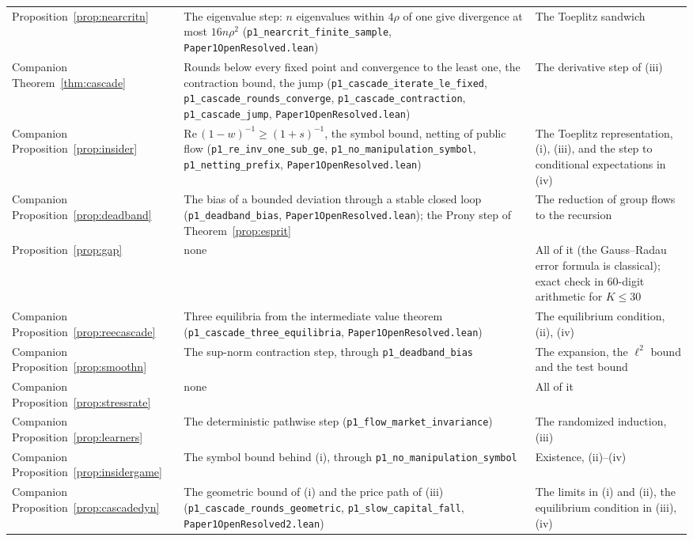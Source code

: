 \documentclass[12pt]{article}
\theoremstyle{definition}
\theoremstyle{remark}
\begin{document}
\begin{longtable}{>{\raggedright\arraybackslash}p{}>{\raggedright\arraybackslash}p{}>{\raggedright\arraybackslash}p{}}
Proposition~\ref{prop:nearcritn} & The eigenvalue step: $n$ eigenvalues within $4\rho$ of one give divergence at most $16n\rho^2$ (\texttt{p1\_nearcrit\_finite\_sample}, \nolinkurl{Paper1OpenResolved.lean}) & The Toeplitz sandwich\\
Companion Theorem~\ref{thm:cascade} & Rounds below every fixed point and convergence to the least one, the contraction bound, the jump (\texttt{p1\_cascade\_iterate\_le\_fixed}, \texttt{p1\_cascade\_rounds\_converge}, \texttt{p1\_cascade\_contraction}, \texttt{p1\_cascade\_jump}, \nolinkurl{Paper1OpenResolved.lean}) & The derivative step of (iii)\\
Companion Proposition~\ref{prop:insider} & $\mathrm{Re}\,(1-w)^{-1}\ge(1+s)^{-1}$, the symbol bound, netting of public flow (\texttt{p1\_re\_inv\_one\_sub\_ge}, \texttt{p1\_no\_manipulation\_symbol}, \texttt{p1\_netting\_prefix}, \nolinkurl{Paper1OpenResolved.lean}) & The Toeplitz representation, (i), (iii), and the step to conditional expectations in (iv)\\
Companion Proposition~\ref{prop:deadband} & The bias of a bounded deviation through a stable closed loop (\texttt{p1\_deadband\_bias}, \nolinkurl{Paper1OpenResolved.lean}); the Prony step of Theorem~\ref{prop:esprit} & The reduction of group flows to the recursion\\
Proposition~\ref{prop:gap} & none & All of it (the Gauss--Radau error formula is classical); exact check in 60-digit arithmetic for $K\le30$\\
Companion Proposition~\ref{prop:reecascade} & Three equilibria from the intermediate value theorem (\texttt{p1\_cascade\_three\_equilibria}, \nolinkurl{Paper1OpenResolved.lean}) & The equilibrium condition, (ii), (iv)\\
Companion Proposition~\ref{prop:smoothn} & The sup-norm contraction step, through \texttt{p1\_deadband\_bias} & The expansion, the $\ell^2$ bound and the test bound\\
Companion Proposition~\ref{prop:stressrate} & none & All of it\\
Companion Proposition~\ref{prop:learners} & The deterministic pathwise step (\texttt{p1\_flow\_market\_invariance}) & The randomized induction, (iii)\\
Companion Proposition~\ref{prop:insidergame} & The symbol bound behind (i), through \texttt{p1\_no\_manipulation\_symbol} & Existence, (ii)--(iv)\\
Companion Proposition~\ref{prop:cascadedyn} & The geometric bound of (i) and the price path of (iii) (\texttt{p1\_cascade\_rounds\_geometric}, \texttt{p1\_slow\_capital\_fall}, \nolinkurl{Paper1OpenResolved2.lean}) & The limits in (i) and (ii), the equilibrium condition in (iii), (iv)\\

\end{longtable}
\end{document}
